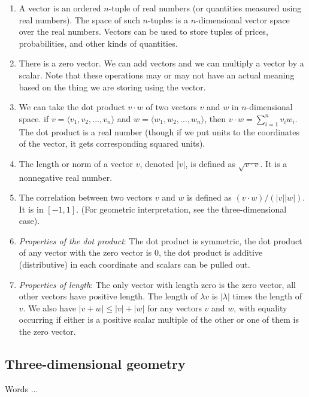 \documentclass[10pt]{amsart}
\begin{document}
\begin{enumerate}
\item A vector is an ordered $n$-tuple of real numbers (or quantities
  measured using real numbers). The space of such $n$-tuples is a
  $n$-dimensional vector space over the real numbers. Vectors can be
  used to store tuples of prices, probabilities, and other kinds of
  quantities.
\item There is a zero vector. We can add vectors and we can multiply a
  vector by a scalar. Note that these operations may or may not have
  an actual meaning based on the thing we are storing using the vector.
\item We can take the dot product $v \cdot w$ of two vectors $v$ and
  $w$ in $n$-dimensional space. if $v = \langle v_1, v_2, \dots, v_n
  \rangle$ and $w = \langle w_1, w_2, \dots, w_n \rangle$, then $v
  \cdot w = \sum_{i=1}^n v_iw_i$. The dot product is a real number
  (though if we put units to the coordinates of the vector, it gets
  corresponding squared units).
\item The length or norm of a vector $v$, denoted $|v|$, is defined as
  $\sqrt{v \cdot v}$. It is a nonnegative real number.
\item The correlation between two vectors $v$ and $w$ is defined as
  $(v \cdot w)/(|v||w|)$. It is in $[-1,1]$. (For geometric
  interpretation, see the three-dimensional case).
\item {\em Properties of the dot product}: The dot product is
  symmetric, the dot product of any vector with the zero vector is
  $0$, the dot product is additive (distributive) in each coordinate
  and scalars can be pulled out.
\item {\em Properties of length}: The only vector with length zero is
  the zero vector, all other vectors have positive length. The length
  of $\lambda v$ is $|\lambda|$ times the length of $v$. We also have
  $|v + w| \le |v| + |w|$ for any vectors $v$ and $w$, with equality
  occurring if either is a positive scalar multiple of the other or
  one of them is the zero vector.
\end{enumerate}

\subsection{Three-dimensional geometry}

Words ...
\end{document}
